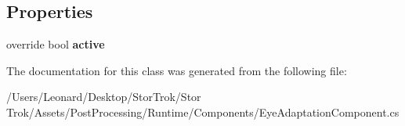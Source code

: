 \subsection*{Properties}
\begin{DoxyCompactItemize}
\item 
\mbox{\label{class_unity_engine_1_1_post_processing_1_1_eye_adaptation_component_ae4f7d376419dd90448617b828a9b1238}} 
override bool {\bfseries active}
\end{DoxyCompactItemize}


The documentation for this class was generated from the following file\+:\begin{DoxyCompactItemize}
\item 
/\+Users/\+Leonard/\+Desktop/\+Stor\+Trok/\+Stor Trok/\+Assets/\+Post\+Processing/\+Runtime/\+Components/Eye\+Adaptation\+Component.\+cs\end{DoxyCompactItemize}
